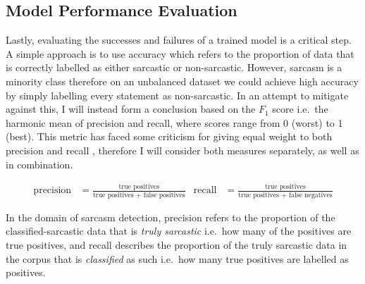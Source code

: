 \documentclass[12pt,a4paper]{article}
\begin{document}
\subsection{Model Performance Evaluation}
\noindent Lastly, evaluating the successes and failures of a trained model is a critical step. A simple approach is to use accuracy which refers to the proportion of data that is correctly labelled as either sarcastic or non-sarcastic. However, sarcasm is a minority class therefore on an unbalanced dataset we could achieve high accuracy by simply labelling every statement as non-sarcastic. In an attempt to mitigate against this, I will instead form a conclusion based on the $F_{1}$ score i.e.\ the harmonic mean of precision and recall, where scores range from 0 (worst) to 1 (best). This metric has faced some criticism for giving equal weight to both precision and recall \cite{hand2018note}, therefore I will consider both measures separately, as well as in combination.

\begin{align*}
\mbox{precision} &= \frac{\mbox{true positives}}{\mbox{true positives + false positives}}   &  \mbox{recall} &= \frac{\mbox{true positives}}{\mbox{true positives + false negatives}}
\end{align*}

\noindent In the domain of sarcasm detection, precision refers to the proportion of the classified-sarcastic data that is \textit{truly sarcastic} i.e.\ how many of the positives are true positives, and recall describes the proportion of the truly sarcastic data in the corpus that is \textit{classified} as such i.e.\ how many true positives are labelled as positives. \\


\hrulefill


\end{document}
